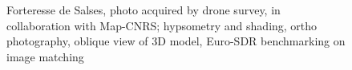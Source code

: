 \begin{figure}
\begin{tabular}{||c|c||}
 \end{tabular}
\caption{Forteresse de Salses, photo acquired by drone survey, in collaboration
with Map-CNRS; hypsometry and shading, ortho photography, oblique view of 3D model, Euro-SDR benchmarking on image matching}
\end{figure}




